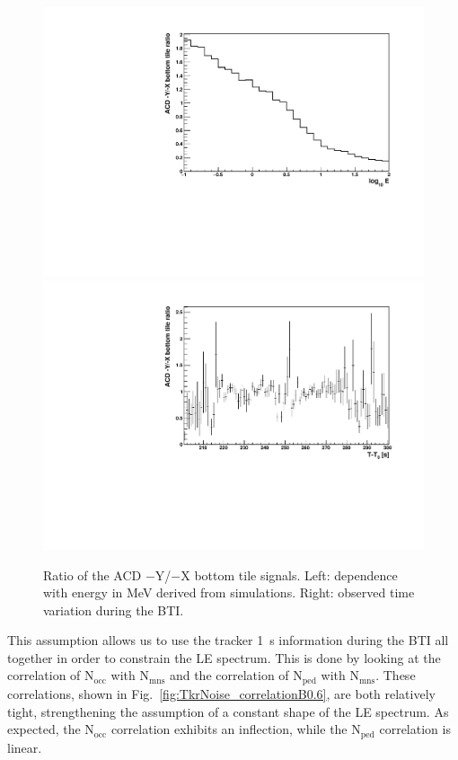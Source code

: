 \documentclass[preprint]{aastex631}
\begin{document}
\begin{figure}[t]
    \centering
    \includegraphics[width=0.45\linewidth]{paper_MC_BottomTilesRatio.pdf}
    \includegraphics[width=0.45\linewidth]{paper_BottomTilesRatio_nbin100.pdf}
    \caption{Ratio of the ACD $-$Y/$-$X bottom tile signals. Left: dependence with energy in MeV derived from simulations. Right: observed time variation during the BTI. }
    \label{fig:ACDbottomtileratio}
\end{figure}

This assumption allows us to use the tracker 1~s information during the BTI all together in order to constrain the LE spectrum. This is done by looking at the correlation of $\mathrm{N}_\mathrm{occ}$ with $\mathrm{N}_\mathrm{mns}$ and the correlation of $\mathrm{N}_\mathrm{ped}$ with $\mathrm{N}_\mathrm{mns}$. These correlations, shown in Fig.~\ref{fig:TkrNoise_correlationB0.6}, are both relatively tight, strengthening the assumption of a constant shape of the LE spectrum. As expected, the $\mathrm{N}_\mathrm{occ}$ correlation exhibits an inflection, while the $\mathrm{N}_\mathrm{ped}$ correlation is linear.
\end{document}
